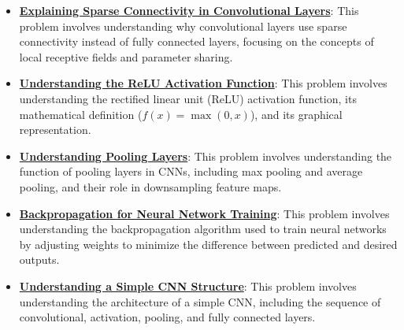 \documentclass{article}%
\begin{document}
\begin{itemize}[leftmargin=*]
\item \href{https://purdue.brightspace.com/d2l/common/assets/pdfjs-d2l-dist/1.0.14-legacy/web/viewer.html?file=\%2Fcontent\%2Fenforced\%2F1095467-wl.202510.CS.24300.001\%2F09L1-cnn.pdf\%3Fou\%3D1095467\&lang=en-us\&container=d2l-fileviewer-rendered-pdf\&fullscreen=d2l-fileviewer-rendered-pdf-dialog\&height=667#page=10}{\textbf{Explaining Sparse Connectivity in Convolutional Layers}}: This problem involves understanding why convolutional layers use sparse connectivity instead of fully connected layers, focusing on the concepts of local receptive fields and parameter sharing.%
\item \href{https://purdue.brightspace.com/d2l/common/assets/pdfjs-d2l-dist/1.0.14-legacy/web/viewer.html?file=\%2Fcontent\%2Fenforced\%2F1095467-wl.202510.CS.24300.001\%2F09L1-cnn.pdf\%3Fou\%3D1095467\&lang=en-us\&container=d2l-fileviewer-rendered-pdf\&fullscreen=d2l-fileviewer-rendered-pdf-dialog\&height=667#page=13}{\textbf{Understanding the ReLU Activation Function}}: This problem involves understanding the rectified linear unit (ReLU) activation function, its mathematical definition ($f(x) = \max(0, x)$), and its graphical representation.%
\item \href{https://purdue.brightspace.com/d2l/common/assets/pdfjs-d2l-dist/1.0.14-legacy/web/viewer.html?file=\%2Fcontent\%2Fenforced\%2F1095467-wl.202510.CS.24300.001\%2F09L1-cnn.pdf\%3Fou\%3D1095467\&lang=en-us\&container=d2l-fileviewer-rendered-pdf\&fullscreen=d2l-fileviewer-rendered-pdf-dialog\&height=667#page=14}{\textbf{Understanding Pooling Layers}}: This problem involves understanding the function of pooling layers in CNNs, including max pooling and average pooling, and their role in downsampling feature maps.%
\item \href{https://purdue.brightspace.com/d2l/common/assets/pdfjs-d2l-dist/1.0.14-legacy/web/viewer.html?file=\%2Fcontent\%2Fenforced\%2F1095467-wl.202510.CS.24300.001\%2F09L1-cnn.pdf\%3Fou\%3D1095467\&lang=en-us\&container=d2l-fileviewer-rendered-pdf\&fullscreen=d2l-fileviewer-rendered-pdf-dialog\&height=667#page=16}{\textbf{Backpropagation for Neural Network Training}}: This problem involves understanding the backpropagation algorithm used to train neural networks by adjusting weights to minimize the difference between predicted and desired outputs.%
\item \href{https://purdue.brightspace.com/d2l/common/assets/pdfjs-d2l-dist/1.0.14-legacy/web/viewer.html?file=\%2Fcontent\%2Fenforced\%2F1095467-wl.202510.CS.24300.001\%2F09L1-cnn.pdf\%3Fou\%3D1095467\&lang=en-us\&container=d2l-fileviewer-rendered-pdf\&fullscreen=d2l-fileviewer-rendered-pdf-dialog\&height=667#page=17}{\textbf{Understanding a Simple CNN Structure}}: This problem involves understanding the architecture of a simple CNN, including the sequence of convolutional, activation, pooling, and fully connected layers.%

\end{itemize}
\end{document}
